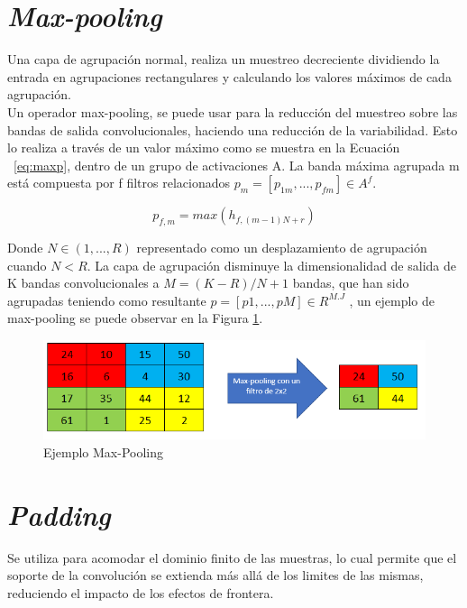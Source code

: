 \section{\textit{Max-pooling}}

Una capa de agrupación normal, realiza un muestreo decreciente dividiendo la entrada en agrupaciones rectangulares y calculando los valores máximos de cada agrupación.\\

Un operador max-pooling, se puede usar para la reducción del muestreo sobre las bandas de salida convolucionales, haciendo una reducción de la variabilidad. Esto lo realiza a través de un valor máximo como se muestra en la Ecuación ~\ref{eq:maxp}, dentro de un grupo de activaciones A. La banda máxima agrupada m está compuesta por f filtros relacionados $p_{m}=[p_{1m},...,p_{fm}] \in A^f$.

\begin{equation}
	\label{eq:maxp}
	p_{f,m}=max(h_{f,(m-1)N+r})
\end{equation}

Donde $N \in (1,...,R) $ representado como un desplazamiento de agrupación cuando $N < R$. La capa de agrupación disminuye la dimensionalidad de salida de K bandas convolucionales a $M=(K-R)/N+1$ bandas, que han sido agrupadas teniendo como resultante $p=[p1,...,pM] \in R^{M.J}$ \cite{gholamalinezhad2020pooling}, un ejemplo de max-pooling se puede observar en la Figura \ref{mp}.

\begin{figure}[ht]
	\centering
	\includegraphics[scale=0.6]{Figs/mp.png}
	\caption{Ejemplo Max-Pooling}
	\label{mp}
\end{figure}



\section{\textit{Padding}}

Se utiliza para acomodar el dominio finito de las muestras, lo cual permite que el soporte de la convolución se extienda más allá de los limites de las mismas, reduciendo el impacto de los efectos de frontera.\\

